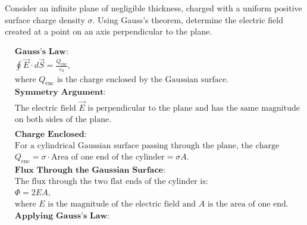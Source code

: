 \documentclass[12pt]{article}
\begin{document}
\section{}
Consider an infinite plane of negligible thickness, charged with a uniform positive surface charge density $ \sigma $. Using Gauss's theorem, determine the electric field created at a point on an axis perpendicular to the plane.

\begin{correctionbox}
	\begin{align*}
		 & \textbf{Gauss's Law:}                                                                                 \\
		 & \oint \vec{E} \cdot d\vec{S} = \frac{Q_{\text{enc}}}{\varepsilon_0},                                  \\
		 & \text{where } Q_{\text{enc}} \text{ is the charge enclosed by the Gaussian surface.}
		\\
		 & \textbf{Symmetry Argument:}                                                                           \\
		 & \text{The electric field } \vec{E} \text{ is perpendicular to the plane and has the same magnitude }  \\
		 & \text{on both sides of the plane.}                                                                    \\
		\\
		 & \textbf{Charge Enclosed:}                                                                             \\
		 & \text{For a cylindrical Gaussian surface passing through the plane, the charge enclosed is:}          \\
		 & Q_{\text{enc}} = \sigma \cdot \text{Area of one end of the cylinder} = \sigma A.
		\\
		 & \textbf{Flux Through the Gaussian Surface:}                                                           \\
		 & \text{The flux through the two flat ends of the cylinder is:}                                         \\
		 & \Phi = 2EA,
		\\
		 & \text{where } E \text{ is the magnitude of the electric field and } A \text{ is the area of one end.}
		\\
		 & \textbf{Applying Gauss's Law:}                                                                        \\

\end{align*}
\end{correctionbox}
\end{document}
